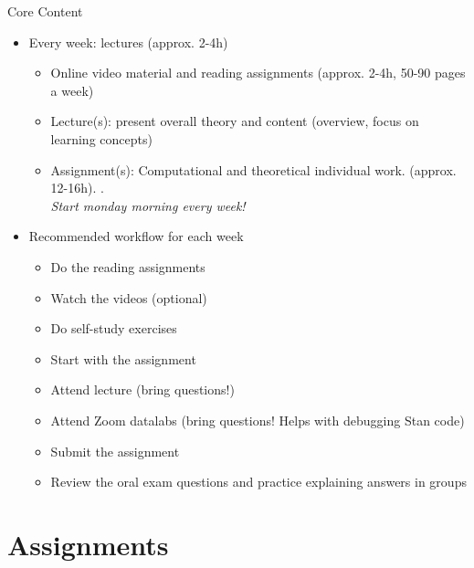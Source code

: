 \documentclass[10pt]{beamer}
\begin{document}
\begin{frame}{Core Content}

\begin{itemize}
\item Every week: lectures (approx. 2-4h)
\begin{itemize}
\item Online video material and reading assignments (approx. 2-4h, 50-90 pages a week)
\item Lecture(s): present overall theory and content (overview, focus on learning concepts)
\item Assignment(s): Computational and theoretical individual work. (approx. 12-16h). . \\ \emph{Start monday morning every week!}
\end{itemize}
\pause
\item Recommended workflow for each week
\begin{itemize}
\item Do the reading assignments
\item Watch the videos (optional)
\item Do self-study exercises
\item Start with the assignment
\item Attend lecture (bring questions!)
\item Attend Zoom datalabs (bring questions! Helps with debugging Stan code)
\item Submit the assignment
\item Review the oral exam questions and practice explaining answers in groups
\end{itemize}
\end{itemize}

\end{frame}

\section{Assignments}
\frame{\sectionpage}
\end{document}
